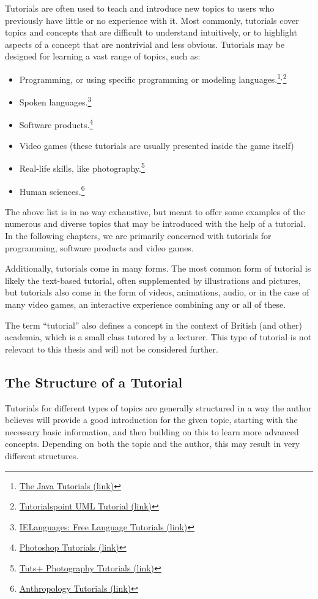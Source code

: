 \noindent
Tutorials are often used to teach and introduce new topics to users who previously have little or no experience with it. Most commonly, tutorials cover topics and concepts that are difficult to understand intuitively, or to highlight aspects of a concept that are nontrivial and less obvious. Tutorials may be designed for learning a vast range of topics, such as:
\begin{itemize}
	\item Programming, or using specific programming or modeling languages.\footnote{\href{http://docs.oracle.com/javase/tutorial/}{The Java Tutorials  (link)}}$^{,}$\footnote{\href{http://www.tutorialspoint.com/uml/}{Tutorialspoint UML Tutorial (link)}}
	\item Spoken languages.\footnote{\href{http://ielanguages.com/}{IELanguages: Free Language Tutorials (link)}}
	\item Software products.\footnote{\href{http://www.photoshoptutorials.ws/category/photoshop-tutorials/}{Photoshop Tutorials (link)}}
	\item Video games (these tutorials are usually presented inside the game itself)
	\item Real-life skills, like photography.\footnote{\href{http://photography.tutsplus.com/}{Tuts+ Photography Tutorials (link)}}
	\item Human sciences.\footnote{\href{http://anthro.palomar.edu/tutorials/}{Anthropology Tutorials (link)}}
\end{itemize}

\noindent
The above list is in no way exhaustive, but meant to offer some examples of the numerous and diverse topics that may be introduced with the help of a tutorial. In the following chapters, we are primarily concerned with tutorials for programming, software products and video games.

\noindent
Additionally, tutorials come in many forms. The most common form of tutorial is likely the text-based tutorial, often supplemented by illustrations and pictures, but tutorials also come in the form of videos, animations, audio, or in the case of many video games, an interactive experience combining any or all of these.

\noindent
The term ``tutorial'' also defines a concept in the context of British (and other) academia, which is a small class tutored by a lecturer. This type of tutorial is not relevant to this thesis and will not be considered further.

\subsection{The Structure of a Tutorial}
\label{sec:tutorial_structure}
Tutorials for different types of topics are generally structured in a way the author believes will provide a good introduction for the given topic, starting with the necessary basic information, and then building on this to learn more advanced concepts. Depending on both the topic and the author, this may result in very different structures.

